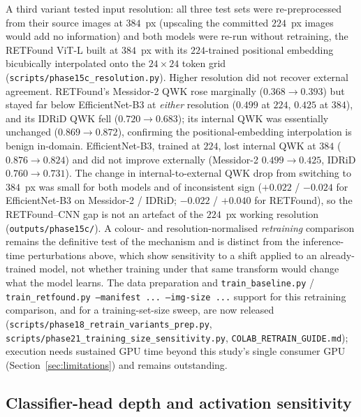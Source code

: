 \documentclass[journal]{IEEEtran}
\begin{document}
A third variant tested input resolution: all three test sets were
re-preprocessed from their source images at $384$~px (upscaling the committed
$224$~px images would add no information) and both models were re-run without
retraining, the RETFound ViT-L built at $384$~px with its $224$-trained
positional embedding bicubically interpolated onto the $24{\times}24$ token grid
(\texttt{scripts/phase15c\_resolution.py}). Higher resolution did not recover
external agreement. RETFound's Messidor-2 QWK rose marginally
($0.368 \to 0.393$) but stayed far below EfficientNet-B3 at \emph{either}
resolution ($0.499$ at $224$, $0.425$ at $384$), and its IDRiD QWK fell
($0.720 \to 0.683$); its internal QWK was essentially unchanged
($0.869 \to 0.872$), confirming the positional-embedding interpolation is benign
in-domain. EfficientNet-B3, trained at $224$, lost internal QWK at $384$
($0.876 \to 0.824$) and did not improve externally (Messidor-2 $0.499 \to 0.425$,
IDRiD $0.760 \to 0.731$). The change in internal-to-external QWK drop from
switching to $384$~px was small for both models and of inconsistent sign
($+0.022$ / $-0.024$ for EfficientNet-B3 on Messidor-2 / IDRiD; $-0.022$ /
$+0.040$ for RETFound), so the RETFound--CNN gap is not an artefact of the
$224$~px working resolution (\texttt{outputs/phase15c/}). A colour- and
resolution-normalised \emph{retraining} comparison remains the definitive test
of the mechanism and is distinct from the inference-time perturbations above,
which show sensitivity to a shift applied to an already-trained model, not
whether training under that same transform would change what the model learns.
The data preparation and \texttt{train\_baseline.py} /
\texttt{train\_retfound.py --manifest ... --img-size ...} support for this
retraining comparison, and for a training-set-size sweep, are now released
(\texttt{scripts/phase18\_retrain\_variants\_prep.py},
\texttt{scripts/phase21\_training\_size\_sensitivity.py},
\texttt{COLAB\_RETRAIN\_GUIDE.md}); execution needs sustained GPU time beyond
this study's single consumer GPU (Section~\ref{sec:limitations}) and remains
outstanding.


\subsection{Classifier-head depth and activation sensitivity}
\label{sec:results-headdepth}
\end{document}

